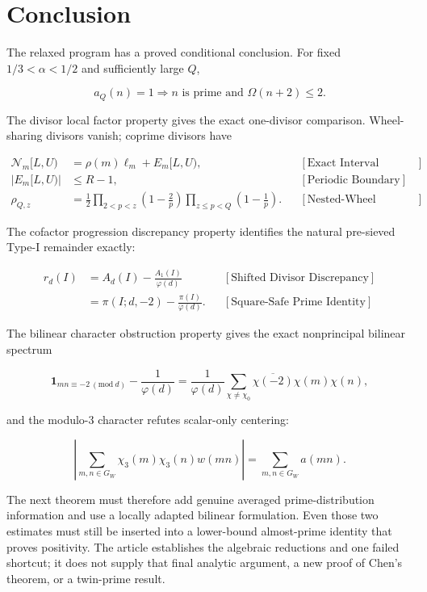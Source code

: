 \section{Conclusion}

The relaxed program has a proved conditional conclusion. For fixed
$1/3\lt\alpha\lt1/2$ and sufficiently large $Q$,

\begin{equation*}
a_Q(n)=1
\Longrightarrow
n\text{ is prime and }\Omega(n+2)\le2.
\end{equation*}

The divisor local factor property gives the exact one-divisor comparison. Wheel-sharing divisors
vanish; coprime divisors have

\begin{equation*}
\begin{aligned}
\mathcal N_m[L,U)
&=\rho(m)\ell_m+E_m[L,U),
&&[\text{Exact Interval Decomposition}]\\
|E_m[L,U)|&\le R-1,
&&[\text{Periodic Boundary}]\\
\rho_{Q,z}
&=
\frac12
\prod_{2\lt p\lt z}\left(1-\frac2p\right)
\prod_{z\le p\lt Q}\left(1-\frac1p\right).
&&[\text{Nested-Wheel Specialization}]
\end{aligned}
\end{equation*}

The cofactor progression discrepancy property identifies the natural pre-sieved Type-I remainder exactly:

\begin{equation*}
\begin{aligned}
r_d(I)
&=A_d(I)-\frac{A_1(I)}{\varphi(d)}
&&[\text{Shifted Divisor Discrepancy}]\\
&=\pi(I;d,-2)-\frac{\pi(I)}{\varphi(d)}.
&&[\text{Square-Safe Prime Identity}]
\end{aligned}
\end{equation*}

The bilinear character obstruction property gives the exact nonprincipal bilinear spectrum

\begin{equation*}
\mathbf1_{mn\equiv-2\ (\mathrm{mod}\ d)}
-\frac1{\varphi(d)}
=
\frac1{\varphi(d)}
\sum_{\chi\ne\chi_0}
\overline{\chi(-2)}\chi(m)\chi(n),
\end{equation*}

and the modulo-$3$ character refutes scalar-only centering:

\begin{equation*}
\left|
\sum_{m,n\in G_W}\chi_3(m)\chi_3(n)w(mn)
\right|
=
\sum_{m,n\in G_W}a(mn).
\end{equation*}

The next theorem must therefore add genuine averaged prime-distribution
information and use a locally adapted bilinear formulation. Even those two
estimates must still be inserted into a lower-bound almost-prime identity that
proves positivity. The article establishes the algebraic reductions and one
failed shortcut; it does not supply that final analytic argument, a new proof
of Chen's theorem, or a twin-prime result.
